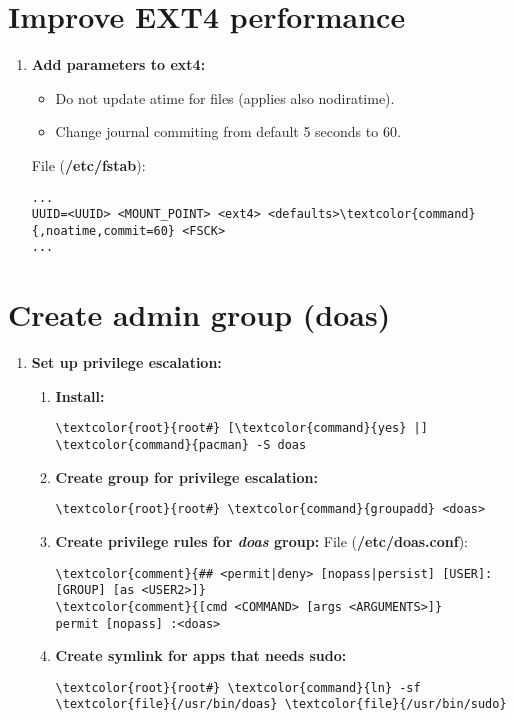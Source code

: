 \documentclass[10pt, a4paper, onecolumn, openany]{book} %
\begin{document}
\section{Improve EXT4 performance}
\begin{enumerate}
    \item \textbf{Add parameters to ext4:}
    \begin{itemize}
        \item Do not update atime for files (applies also nodiratime).
        \item Change journal commiting from default 5 seconds to 60.
    \end{itemize}
File (\textbf{\textcolor{file}{/etc/fstab}}):
\begin{Verbatim}[commandchars=\\\{\}]
...
UUID=<UUID> <MOUNT_POINT> <ext4> <defaults>\textcolor{command}{,noatime,commit=60} <FSCK>
...
\end{Verbatim}
\end{enumerate}
\section{Create admin group (doas)}
\begin{enumerate}
    \item \textbf{Set up privilege escalation:}
    \begin{enumerate}
        \item \textbf{Install:}
\begin{Verbatim}[commandchars=\\\{\}]
\textcolor{root}{root#} [\textcolor{command}{yes} |] \textcolor{command}{pacman} -S doas
\end{Verbatim}
        \item \textbf{Create group for privilege escalation:}
\begin{Verbatim}[commandchars=\\\{\}]
\textcolor{root}{root#} \textcolor{command}{groupadd} <doas>
\end{Verbatim}
        \item \textbf{Create privilege rules for \textit{doas} group:}
\newline File (\textbf{\textcolor{file}{/etc/doas.conf}}):
\begin{Verbatim}[commandchars=\\\{\}]
\textcolor{comment}{## <permit|deny> [nopass|persist] [USER]:[GROUP] [as <USER2>]}
\textcolor{comment}{[cmd <COMMAND> [args <ARGUMENTS>]}
permit [nopass] :<doas>
\end{Verbatim}
    \item \textbf{Create symlink for apps that needs sudo:}
\begin{Verbatim}[commandchars=\\\{\}]
\textcolor{root}{root#} \textcolor{command}{ln} -sf \textcolor{file}{/usr/bin/doas} \textcolor{file}{/usr/bin/sudo}
\end{Verbatim}
    \end{enumerate}

\end{enumerate}
\end{document}
